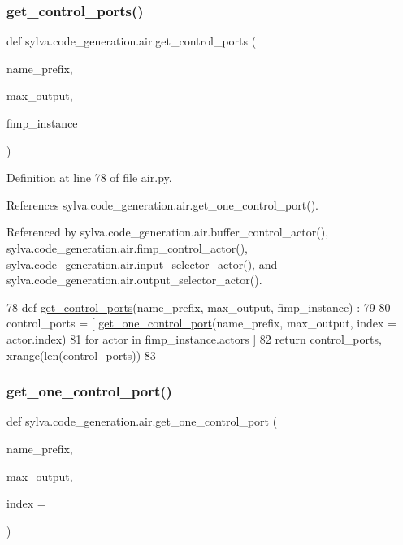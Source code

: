 \subsubsection{\texorpdfstring{get\+\_\+control\+\_\+ports()}{get\_control\_ports()}}
{\footnotesize\ttfamily def sylva.\+code\+\_\+generation.\+air.\+get\+\_\+control\+\_\+ports (\begin{DoxyParamCaption}\item[{}]{name\+\_\+prefix,  }\item[{}]{max\+\_\+output,  }\item[{}]{fimp\+\_\+instance }\end{DoxyParamCaption})}



Definition at line 78 of file air.\+py.



References sylva.\+code\+\_\+generation.\+air.\+get\+\_\+one\+\_\+control\+\_\+port().



Referenced by sylva.\+code\+\_\+generation.\+air.\+buffer\+\_\+control\+\_\+actor(), sylva.\+code\+\_\+generation.\+air.\+fimp\+\_\+control\+\_\+actor(), sylva.\+code\+\_\+generation.\+air.\+input\+\_\+selector\+\_\+actor(), and sylva.\+code\+\_\+generation.\+air.\+output\+\_\+selector\+\_\+actor().


\begin{DoxyCode}
78 \textcolor{keyword}{def }\hyperlink{namespacesylva_1_1code__generation_1_1air_a71d379169f113b29c326aa9f70c6d47e}{get\_control\_ports}(name\_prefix, max\_output, fimp\_instance) :
79 
80   control\_ports = [ \hyperlink{namespacesylva_1_1code__generation_1_1air_aab89db05c96a30b48a7afc9c857af6d7}{get\_one\_control\_port}(name\_prefix, max\_output, index = actor.index)
81                     \textcolor{keywordflow}{for} actor \textcolor{keywordflow}{in} fimp\_instance.actors ]
82   \textcolor{keywordflow}{return} control\_ports, xrange(len(control\_ports))
83 
\end{DoxyCode}
\mbox{\label{namespacesylva_1_1code__generation_1_1air_aab89db05c96a30b48a7afc9c857af6d7}} 
\subsubsection{\texorpdfstring{get\+\_\+one\+\_\+control\+\_\+port()}{get\_one\_control\_port()}}
{\footnotesize\ttfamily def sylva.\+code\+\_\+generation.\+air.\+get\+\_\+one\+\_\+control\+\_\+port (\begin{DoxyParamCaption}\item[{}]{name\+\_\+prefix,  }\item[{}]{max\+\_\+output,  }\item[{}]{index = {} }\end{DoxyParamCaption})}



